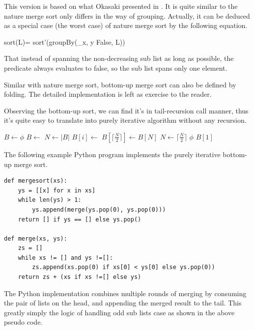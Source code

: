 \documentclass[b5paper]{article}
\begin{document}
This version is based on what Okasaki presented in \cite{okasaki-book}. It is quite similar to the nature merge sort
only differs in the way of grouping. Actually, it can be deduced as a special case (the worst case) of
nature merge sort by the following equation.

\be
sort(L)= sort'(groupBy(\lambda_{x, y} \cdot False, L))
\ee

That instead of spanning the non-decreasing sub list as long as possible, the predicate always evaluates to false,
so the sub list spans only one element.

Similar with nature merge sort, bottom-up merge sort can also be defined by folding. The detailed implementation
is left as exercise to the reader.

Observing the bottom-up sort, we can find it's in tail-recursion call manner, thus it's quite easy
to translate into purely iterative algorithm without any recursion.

\begin{algorithmic}[1]
  \State $B \gets \phi$
    \State $B \gets$ 
  \EndFor
  \State $N \gets |B|$
      \State $B[i] \gets$ 
    \EndFor
      \State $B[\lceil \frac{N}{2} \rceil] \gets B[N]$
    \EndIf
    \State $N \gets \lceil \frac{N}{2} \rceil$
  \EndWhile
    \State \Return $\phi$
  \EndIf
  \State \Return $B[1]$
\EndFunction
\end{algorithmic}

The following example Python program implements the purely iterative bottom-up merge sort.

\lstset{language=Python}
\begin{lstlisting}
def mergesort(xs):
    ys = [[x] for x in xs]
    while len(ys) > 1:
        ys.append(merge(ys.pop(0), ys.pop(0)))
    return [] if ys == [] else ys.pop()

def merge(xs, ys):
    zs = []
    while xs != [] and ys !=[]:
        zs.append(xs.pop(0) if xs[0] < ys[0] else ys.pop(0))
    return zs + (xs if xs !=[] else ys)
\end{lstlisting}

The Python implementation combines multiple rounds of merging by consuming
the pair of lists on the head, and appending the merged result to the tail. This greatly simply
the logic of handling odd sub lists case as shown in the above pseudo code.
\end{document}
